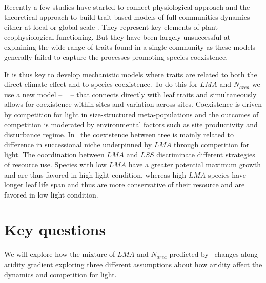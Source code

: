 \documentclass[a4paper,11pt]{article}
\begin{document}
Recently a few studies have started to connect physiological approach
and the theoretical approach to build trait-based models of full
communities dynamics either at local \citep{Farrior-2013} or global
scale \citep[see][]{Sakschewski-2015,Scheiter-2013}. They represent key elements of plant ecophysiological functioning. But they have been largely unsuccessful at explaining the wide range of traits found in a single community as these models generally failed to capture the processes promoting species coexistence.

It is thus key to develop mechanistic models where traits are related
to both the direct climate effect and to species coexistence. To do
this for $LMA$ and $N_{area}$ we use a new model -- \plant\
\citep{Falster-2016,Falster-2017} -- that connects directly with leaf
traits and simultaneously allows for coexistence within sites and
variation across sites. Coexistence is driven by competition for light
in size-structured meta-populations and the outcomes of competition is
moderated by environmental factors such as site productivity and
disturbance regime. In \plant\ the coexistence between tree is mainly related to difference in successional niche underpinned by $LMA$ through competition for light. The coordination between $LMA$ and $LSS$ discriminate different strategies of resource use. Species with low $LMA$ have a greater potential maximum growth and are thus favored in high light condition, whereas high $LMA$ species have longer leaf life span and thus are more conservative of their resource and are favored in low light condition.

\section{Key questions}

We will explore how the mixture of $LMA$ and $N_{area}$ predicted by \plant\ changes along aridity gradient exploring three different assumptions about how aridity
affect the dynamics and competition for light.
\end{document}
